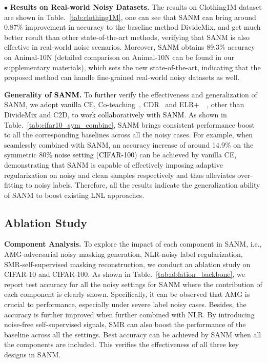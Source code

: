 \documentclass[10pt,twocolumn,letterpaper]{article}
\newcommand{\zbs}[1]{\textcolor{black}{#1}}
\begin{document}
 



$\bullet$ \textbf{Results on Real-world Noisy Datasets.} 
The results on Clothing1M dataset are shown in Table.~\ref{tab:clothing1M}, one can see that SANM can bring around 0.87\% improvement in accuracy to the baseline method DivideMix, and get much better result than other state-of-the-art methods, verifying that SANM is also effective in real-world noise scenarios. 
Moreover, SANM obtains 89.3\% accuracy on Animal-10N (detailed comparison on Animal-10N can be found in our supplementary materials), which sets the new state-of-the-art, indicating that the proposed method can handle fine-grained real-world noisy datasets as well. 


\textbf{Generality \zbs{of SANM}.} 
To \zbs{further} verify the effectiveness and generalization of SANM, we \zbs{adopt vanilla} CE, Co-teaching~\cite{Co-han2018co}, CDR~\cite{2021CDR} and ELR+~~\cite{2020ELR}, other than DivideMix and C2D, \zbs{to work collaboratively with SANM}. As shown in Table.~\ref{tab:cifar10_sym_combine}, SANM brings consistent performance boost to all the corresponding baselines across all the noisy cases. For example, when seamlessly combined with SANM, an accuracy increase of around 14.9\% on the symmetric 80\% \zbs{noise setting (CIFAR-100)} can be achieved by vanilla CE, demonstrating that SANM is capable of effectively imposing adaptive regularization on noisy and clean samples respectively and thus alleviates over-fitting to noisy labels. Therefore, all the results indicate the generalization ability of SANM to boost existing LNL approaches. 

\vspace{-2mm}
\subsection{Ablation Study}

\textbf{Component Analysis.} To explore the impact of each component in SANM, i.e., AMG-adversarial noisy masking generation, NLR-noisy label regularization, SMR-self-supervised masking reconstruction, we conduct an ablation study on CIFAR-10 and CIFAR-100. As shown in Table.~\ref{tab:ablation_backbone}, we report test accuracy for all the noisy settings for SANM where the contribution of each component is clearly shown. Specifically, it can be observed that AMG is crucial to performance, especially under severe label noisy cases. Besides, the accuracy is {further} improved when further combined with NLR. By introducing noise-free self-supervised signals, SMR can also boost the performance of the baseline across all the settings. Best accuracy can be achieved by SANM when all the components are included. {This verifies the effectiveness of all three key designs in SANM.}
\end{document}
